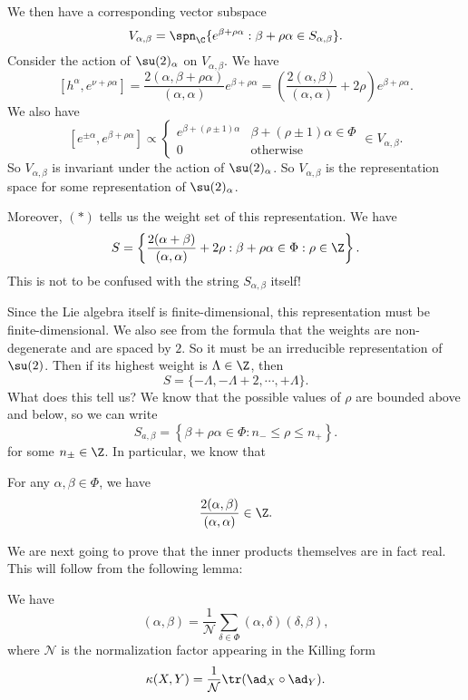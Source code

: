 \documentclass[a4paper]{article}
\begin{document}
We then have a corresponding vector subspace
\[
  V_{\alpha, \beta} = \spn_\C\{e^{\beta + \rho \alpha}: \beta + \rho \alpha \in S_{\alpha,\beta}\}.
\]
Consider the action of $\su(2)_\alpha$ on $V_{\alpha, \beta}$. We have
\[
  [h^\alpha, e^{\nu + \rho \alpha}] = \frac{2(\alpha, \beta + \rho \alpha)}{(\alpha, \alpha)}e^{\beta + \rho \alpha} = \left(\frac{2 (\alpha, \beta)}{(\alpha, \alpha)} + 2\rho\right)e^{\beta + \rho \alpha}.\tag{$*$}
\]
We also have
\[
  [e^{\pm \alpha}, e^{\beta + \rho \alpha}] \propto
  \begin{cases}
    e^{\beta + (\rho \pm 1)\alpha} & \beta + (\rho \pm 1) \alpha \in \Phi\\
    0 & \text{otherwise}
  \end{cases} \in V_{\alpha, \beta}.
\]
So $V_{\alpha, \beta}$ is invariant under the action of $\su(2)_\alpha$. So $V_{\alpha, \beta}$ is the representation space for some representation of $\su(2)_\alpha$.

Moreover, $(*)$ tells us the weight set of this representation. We have
\[
  S = \left\{ \frac{2(\alpha + \beta)}{(\alpha, \alpha)} + 2\rho: \beta + \rho \alpha \in \Phi: \rho \in \Z\right\}.
\]
This is not to be confused with the string $S_{\alpha, \beta}$ itself!

Since the Lie algebra itself is finite-dimensional, this representation must be finite-dimensional. We also see from the formula that the weights are non-degenerate and are spaced by $2$. So it must be an irreducible representation of $\su(2)$. Then if its highest weight is $\Lambda \in \Z$, then
\[
  S = \{-\Lambda, -\Lambda + 2, \cdots, +\Lambda\}.
\]
What does this tell us? We know that the possible values of $\rho$ are bounded above and below, so we can write
\[
  S_{a, \beta} = \left\{ \beta + \rho \alpha \in \Phi: n_- \leq \rho \leq n_+\right\}.
\]
for some $n_{\pm} \in \Z$. In particular, we know that
\begin{prop}
  For any $\alpha, \beta \in \Phi$, we have
  \[
    \frac{2(\alpha, \beta)}{(\alpha,\alpha)} \in \Z.
  \]
\end{prop}

We are next going to prove that the inner products themselves are in fact real. This will follow from the following lemma:
\begin{lemma}
  We have
  \[
    (\alpha, \beta) = \frac{1}{\mathcal{N}} \sum_{\delta \in \Phi} (\alpha, \delta) (\delta, \beta),
  \]
  where $\mathcal{N}$ is the normalization factor appearing in the Killing form
  \[
    \kappa(X, Y) = \frac{1}{\mathcal{N}} \tr(\ad_X \circ \ad_Y).
  \]
\end{lemma}
\end{document}
